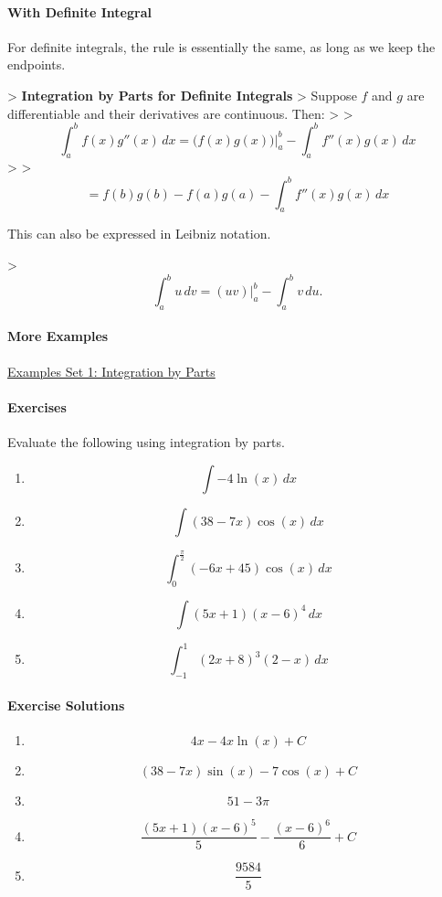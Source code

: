 \paragraph{With Definite Integral}

For definite integrals, the rule is essentially the same, as long as we keep the endpoints.

> \textbf{Integration by Parts for Definite Integrals}  
> Suppose $f$ and $g$ are differentiable and their derivatives are continuous. Then:
> 
> $$\int_a^b f(x)g''(x) \, dx = \big(f(x)g(x)\big)\bigg|_a^b - \int_a^b f''(x)g(x) \, dx$$
> 
> $$= f(b)g(b) - f(a)g(a) - \int_a^b f''(x)g(x) \, dx$$

This can also be expressed in Leibniz notation.

> $$\int_a^b u \, dv = (uv)\Big|_a^b - \int_a^b v \, du.$$

\paragraph{More Examples}

\href{http://en.wikiversity.org/wiki/Application_of_Integration_by_Parts}{Examples Set 1: Integration by Parts}

\paragraph{Exercises}

Evaluate the following using integration by parts.

\begin{enumerate}
    \item \[
    \int -4\ln(x)\,dx
    \]

    \item \[
    \int (38-7x)\cos(x)\,dx
    \]

    \item \[
    \int_0^{\tfrac{\pi}{2}} (-6x+45)\cos(x)\,dx
    \]

    \item \[
    \int (5x+1)(x-6)^4\,dx
    \]

    \item \[
    \int_{-1}^1 (2x+8)^3(2-x)\,dx
    \]
\end{enumerate}

\paragraph{Exercise Solutions}

\begin{enumerate}
    \item \[
    4x - 4x\ln(x) + C
    \]

    \item \[
    (38 - 7x)\sin(x) - 7\cos(x) + C
    \]

    \item \[
    51 - 3\pi
    \]

    \item \[
    \frac{(5x + 1)(x - 6)^5}{5} - \frac{(x - 6)^6}{6} + C
    \]

    \item \[
    \frac{9584}{5}
    \]
\end{enumerate}

